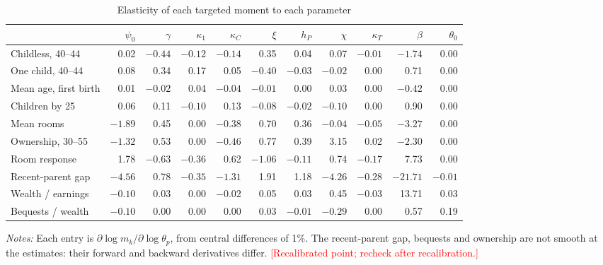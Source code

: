 \begin{table}[h]
\centering
\caption{Elasticity of each targeted moment to each parameter}
\label{tab:app-jacobian}
\footnotesize
\setlength{\tabcolsep}{4pt}
\begin{tabular}{@{}l rrrrrrrrrr@{}}
\toprule
 & $\psi_0$ & $\gamma$ & $\kappa_1$ & $\kappa_C$ & $\xi$ & $h_P$ & $\chi$ & $\kappa_T$ & $\beta$ & $\theta_0$ \\
\midrule
Childless, 40--44 & 0.02 & $-0.44$ & $-0.12$ & $-0.14$ & 0.35 & 0.04 & 0.07 & $-0.01$ & $-1.74$ & 0.00 \\
One child, 40--44 & 0.08 & 0.34 & 0.17 & 0.05 & $-0.40$ & $-0.03$ & $-0.02$ & 0.00 & 0.71 & 0.00 \\
Mean age, first birth & 0.01 & $-0.02$ & 0.04 & $-0.04$ & $-0.01$ & 0.00 & 0.03 & 0.00 & $-0.42$ & 0.00 \\
Children by 25 & 0.06 & 0.11 & $-0.10$ & 0.13 & $-0.08$ & $-0.02$ & $-0.10$ & 0.00 & 0.90 & 0.00 \\
Mean rooms & $-1.89$ & 0.45 & 0.00 & $-0.38$ & 0.70 & 0.36 & $-0.04$ & $-0.05$ & $-3.27$ & 0.00 \\
Ownership, 30--55 & $-1.32$ & 0.53 & 0.00 & $-0.46$ & 0.77 & 0.39 & 3.15 & 0.02 & $-2.30$ & 0.00 \\
Room response & 1.78 & $-0.63$ & $-0.36$ & 0.62 & $-1.06$ & $-0.11$ & 0.74 & $-0.17$ & 7.73 & 0.00 \\
Recent-parent gap & $-4.56$ & 0.78 & $-0.35$ & $-1.31$ & 1.91 & 1.18 & $-4.26$ & $-0.28$ & $-21.71$ & $-0.01$ \\
Wealth / earnings & $-0.10$ & 0.03 & 0.00 & $-0.02$ & 0.05 & 0.03 & 0.45 & $-0.03$ & 13.71 & 0.03 \\
Bequests / wealth & $-0.10$ & 0.00 & 0.00 & 0.00 & 0.03 & $-0.01$ & $-0.29$ & 0.00 & 0.57 & 0.19 \\
\bottomrule
\end{tabular}
\par\smallskip
\begin{minipage}{0.95\linewidth}
\footnotesize\textit{Notes:} Each entry is $\partial\log m_k/\partial\log
\theta_p$, from central differences of 1\%. The recent-parent gap, bequests
and ownership are not smooth at the estimates: their forward and backward
derivatives differ. \textcolor{red}{[Recalibrated point; recheck after
recalibration.]}
\end{minipage}
\end{table}
